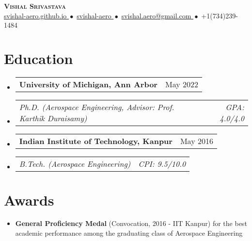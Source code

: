 \documentclass[letterpaper, 11pt]{article}
\makeatletter
\newcommand{\resumeItem}[1]{
  \item\small{{#1\vspace{-2pt}}}
}
\newcommand{\resumeStint}[2]{
  \vspace{-2pt}\item
    \begin{tabular*}{0.97\textwidth}[t]{@{}l@{\extracolsep{\fill}}r}
    \textbf{\small #1} & {\small #2}
  \end{tabular*}\vspace{-7pt}
}
\newcommand{\resumeSubstint}[2]{
  \vspace{-16pt}\item
    \begin{tabular*}{0.97\textwidth}[t]{@{}l@{\extracolsep{\fill}}r}
    {\textit{\small#1}}&{\textit{\small#2}}
  \end{tabular*}%
}
\newcommand{\resumeSubHeadingListStart}{\begin{itemize}[leftmargin=0.15in, label={}]}
\newcommand{\resumeSubHeadingListEnd}{\end{itemize}}
\makeatother
\begin{document}



  \begin{center}
    \textbf{\Huge\scshape Vishal Srivastava}\\
    \vspace{8pt}\small
    \href{https://svishal-aero.github.io}{
      svishal-aero.github.io
    }${ }{ }\bullet{ }{ }$
    \href{https://linkedin.com/in/svishal-aero/}{
      svishal-aero
    }${ }{ }\bullet{ }{ }$
    \href{mailto:svishal.aero@gmail.com}{
      svishal.aero@gmail.com
    }${ }{ }\bullet{ }{ }$
    +1$ $(734)$ $239-1484
  \end{center}


  \section{Education}
  \resumeSubHeadingListStart
    \resumeStint
    {University of Michigan, Ann Arbor}{May 2022}
    \resumeSubstint
    {Ph.D. (Aerospace Engineering, Advisor: Prof. Karthik Duraisamy)}{GPA: 4.0/4.0}
    \vspace{3pt}
    \resumeStint
    {Indian Institute of Technology, Kanpur}{May 2016}
    \resumeSubstint
    {B.Tech. (Aerospace Engineering)}{CPI: 9.5/10.0}
  \resumeSubHeadingListEnd


  \section{Awards}
  \resumeSubHeadingListStart
    \resumeItem{
      \textbf{General Proficiency Medal} (Convocation, 2016 - IIT Kanpur) for
      the best academic performance among the graduating class of Aerospace Engineering
    }
  \resumeSubHeadingListEnd

\end{document}
